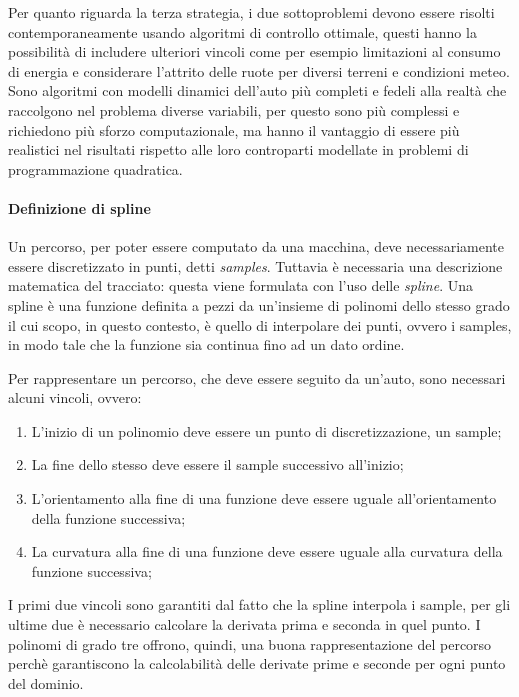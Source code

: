 Per quanto riguarda la terza strategia, i due sottoproblemi devono essere risolti contemporaneamente
usando algoritmi di controllo ottimale, questi hanno la possibilità di includere ulteriori vincoli come
per esempio limitazioni al consumo di energia e considerare l'attrito delle ruote per diversi terreni e
condizioni meteo.\cite{christ2021time} Sono algoritmi con modelli dinamici dell'auto più completi e
fedeli alla realtà che raccolgono nel problema diverse variabili, per questo sono più complessi e
richiedono più sforzo computazionale, ma hanno il vantaggio di essere più realistici nel risultati
rispetto alle loro controparti modellate in problemi di programmazione quadratica.

\paragraph{Definizione di spline \cite{olausson2021optimal} \cite{globalplanning-lec}}
\label{par:spline-def}
Un percorso, per poter essere computato da una macchina, deve necessariamente essere discretizzato in
punti, detti \textit{samples}.
Tuttavia è necessaria una descrizione matematica del tracciato: questa viene formulata con l'uso delle
\textit{spline}. Una spline è una funzione definita a pezzi da un'insieme di polinomi dello stesso grado
il cui scopo, in questo contesto, è quello di interpolare dei punti, ovvero i samples, in modo tale che
la funzione sia continua fino ad un dato ordine.

Per rappresentare un percorso, che deve essere seguito da un'auto, sono necessari alcuni vincoli, ovvero:
\begin{enumerate}
	\item L'inizio di un polinomio deve essere un punto di discretizzazione, un sample;
	\item La fine dello stesso deve essere il sample successivo all'inizio;
	\item L'orientamento alla fine di una funzione deve essere uguale all'orientamento della funzione
	      successiva;
	\item La curvatura alla fine di una funzione deve essere uguale alla curvatura della funzione
	      successiva;
\end{enumerate}
I primi due vincoli sono garantiti dal fatto che la spline interpola i sample, per gli ultime due è
necessario calcolare la derivata prima e seconda in quel punto. I polinomi di grado tre offrono, quindi,
una buona rappresentazione del percorso perchè garantiscono la calcolabilità delle derivate prime e
seconde per ogni punto del dominio.

